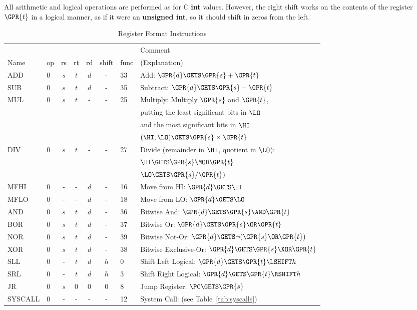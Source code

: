 \documentclass[11pt,letterpaper]{article}
\newcommand{\tabref}[1]{Table~\ref{#1}}  %
\begin{document}
All arithmetic and logical operations are performed as for C
\textbf{int} values.
However, the right shift works on the contents of the register
$\GPR{t}$ in a logical manner, as if it were an \textbf{unsigned int},
so it should shift in zeros from the left.


\begin{table}[htbp]
\caption{Register Format Instructions}
\label{tab:rformatinstrs}
\begin{tabular}{|l|l|c|c|c|c|l|p{9cm}|}
\hline
~       & ~  & ~  & ~  & ~  & ~     &      & Comment \\
Name    & op & rs & rt & rd & shift & func & (Explanation) \\
\hline
ADD     & 0  &$s$ &$t$ &$d$  & -    & 33 & Add: $\GPR{d} \GETS \GPR{s} + \GPR{t}$ \\
\hline
SUB     & 0  &$s$ &$t$ &$d$  & -    & 35 & Subtract: $\GPR{d} \GETS \GPR{s} - \GPR{t}$ \\
\hline
MUL     & 0  &$s$ &$t$ & -   & -    & 25 & Multiply: Multiply
$\GPR{s}$ and $\GPR{t}$, \\
& & & & & & & putting the least significant bits in $\LO$ \\
& & & & & & & and the most significant bits in $\HI$. \\
& & & & & & & $(\HI,\LO) \GETS \GPR{s} \times \GPR{t}$ \\
\hline
DIV     & 0  &$s$ &$t$ & -   & -    & 27 & Divide (remainder in $\HI$, quotient in $\LO$): \\
        &    &    &    &     &      &    & $\HI \GETS \GPR{s} \MOD \GPR{t}$ \\
        &    &    &    &     &      &    & $\LO \GETS \GPR{s} / \GPR{t})$ \\
\hline
MFHI    & 0  & -  & -  & $d$ & -    & 16 & Move from HI: $\GPR{d} \GETS \HI$ \\
\hline
MFLO    & 0  & -  & -  & $d$ & -    & 18 & Move from LO: $\GPR{d} \GETS \LO$ \\
\hline
AND     &  0  &$s$ &$t$ & $d$ & -    & 36 & Bitwise And: $\GPR{d} \GETS \GPR{s} \AND \GPR{t}$ \\
\hline
BOR     &  0  &$s$ &$t$ & $d$ & -    & 37 & Bitwise Or: $\GPR{d} \GETS \GPR{s} \OR \GPR{t}$ \\
\hline
NOR     &  0  &$s$ &$t$ & $d$ & -    & 39 & Bitwise Not-Or: $\GPR{d} \GETS \neg(\GPR{s} \OR \GPR{t})$ \\
\hline
XOR     &  0  &$s$ &$t$ & $d$ & -    & 38 & Bitwise Exclusive-Or: $\GPR{d} \GETS \GPR{s} \XOR \GPR{t}$ \\
\hline
SLL     &  0  & - &$t$ & $d$ & $h$  & 0 & Shift Left Logical: $\GPR{d} \GETS \GPR{t} \LSHIFT h$ \\
\hline
SRL     &  0  & - &$t$ & $d$ & $h$  & 3 & Shift Right Logical: $\GPR{d} \GETS \GPR{t} \RSHIFT h$ \\
\hline
JR      &  0  &$s$ & 0 &  0  &  0   & 8 & Jump Register: $\PC \GETS \GPR{s}$ \\
\hline
SYSCALL &  0  & -  & - & -   & -   & 12 & System Call: (see \tabref{tab:syscalls}) \\
\hline
\end{tabular}
\end{table}
\end{document}
